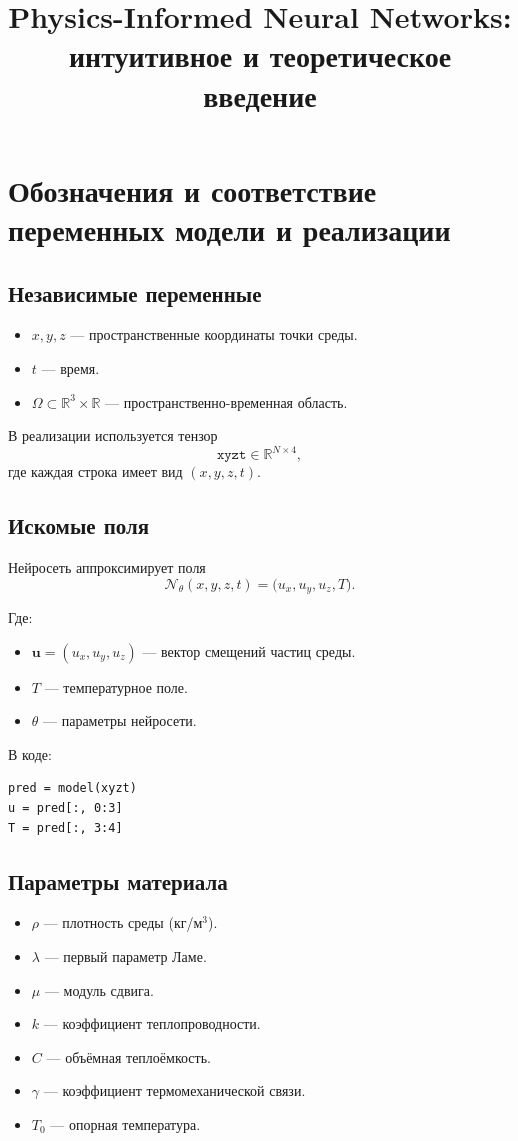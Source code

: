 \documentclass[12pt]{article}
\title{Physics-Informed Neural Networks:\\
интуитивное и теоретическое введение}
\author{}
\date{}
\begin{document}
\section{Обозначения и соответствие переменных модели и реализации}

\subsection{Независимые переменные}

\begin{itemize}
\item $x,y,z$ --- пространственные координаты точки среды.
\item $t$ --- время.
\item $\Omega \subset \mathbb{R}^3 \times \mathbb{R}$ --- пространственно-временная область.
\end{itemize}

В реализации используется тензор
\[
\texttt{xyzt} \in \mathbb{R}^{N \times 4},
\]
где каждая строка имеет вид $(x,y,z,t)$.

\subsection{Искомые поля}

Нейросеть аппроксимирует поля
\[
\mathcal{N}_\theta(x,y,z,t)
=
\big(u_x,u_y,u_z,T\big).
\]

Где:

\begin{itemize}
\item $\mathbf{u}=(u_x,u_y,u_z)$ --- вектор смещений частиц среды.
\item $T$ --- температурное поле.
\item $\theta$ --- параметры нейросети.
\end{itemize}

В коде:
\begin{verbatim}
pred = model(xyzt)
u = pred[:, 0:3]
T = pred[:, 3:4]
\end{verbatim}

\subsection{Параметры материала}

\begin{itemize}
\item $\rho$ --- плотность среды (кг/м$^3$).
\item $\lambda$ --- первый параметр Ламе.
\item $\mu$ --- модуль сдвига.
\item $k$ --- коэффициент теплопроводности.
\item $C$ --- объёмная теплоёмкость.
\item $\gamma$ --- коэффициент термомеханической связи.
\item $T_0$ --- опорная температура.
\end{itemize}
\end{document}
